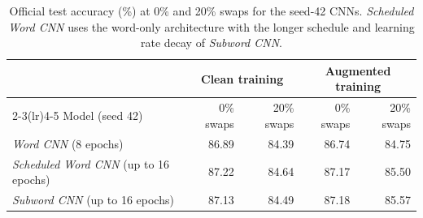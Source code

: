 \begin{table}[H]\centering\small
\begin{tabular}{lrrrr}\toprule
 & \multicolumn{2}{c}{Clean training} & \multicolumn{2}{c}{Augmented training} \\
\cmidrule(lr){2-3}\cmidrule(lr){4-5}
Model (seed 42) & 0\% swaps & 20\% swaps & 0\% swaps & 20\% swaps \\\midrule
\textit{Word CNN} (8 epochs) & 86.89 & 84.39 & 86.74 & 84.75 \\
\textit{Scheduled Word CNN} (up to 16 epochs) & 87.22 & 84.64 & 87.17 & 85.50 \\
\textit{Subword CNN} (up to 16 epochs) & 87.13 & 84.49 & 87.18 & 85.57 \\
\bottomrule
\end{tabular}
\caption[Schedule ablation results]{Official test accuracy (\%) at 0\% and 20\% swaps for the seed-42 CNNs. \textit{Scheduled Word CNN} uses the word-only architecture with the longer schedule and learning rate decay of \textit{Subword CNN}.}\label{tab:scheduled-review}
\end{table}
